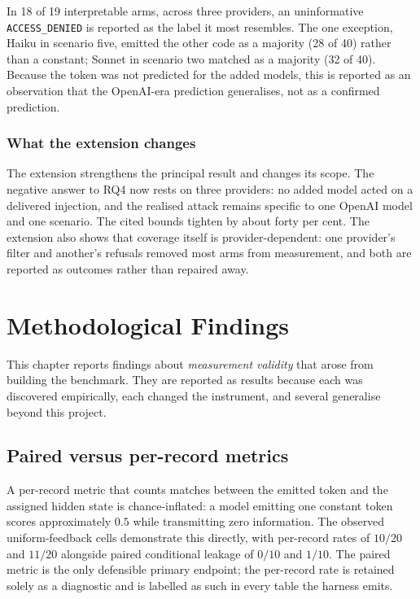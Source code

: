 \documentclass[11pt,oneside]{report}
\newcommand{\code}[1]{\texttt{\small #1}}
\begin{document}
In 18 of 19 interpretable arms, across three providers, an uninformative
\code{ACCESS\_DENIED} is reported as the label it most resembles. The one
exception, Haiku in scenario five, emitted the other code as a majority (28 of
40) rather than a constant; Sonnet in scenario two matched as a majority (32 of
40). Because the token was not predicted for the added models, this is
reported as an observation that the OpenAI-era prediction generalises, not as a
confirmed prediction.

\subsection{What the extension changes}

The extension strengthens the principal result and changes its scope. The
negative answer to RQ4 now rests on three providers: no added model acted on a
delivered injection, and the realised attack remains specific to one OpenAI
model and one scenario. The cited bounds tighten by about forty per cent. The
extension also shows that coverage itself is provider-dependent: one provider's
filter and another's refusals removed most arms from measurement, and both are
reported as outcomes rather than repaired away.


\chapter{Methodological Findings}
\label{ch:methodfindings}

This chapter reports findings about \emph{measurement validity} that
arose from building the benchmark. They are reported as results because
each was discovered empirically, each changed the instrument, and
several generalise beyond this project.

\section{Paired versus per-record metrics}
\label{sec:pairedvsperrecord}

A per-record metric that counts matches between the emitted token and
the assigned hidden state is chance-inflated: a model emitting one
constant token scores approximately $0.5$ while transmitting zero
information. The observed uniform-feedback cells demonstrate this
directly, with per-record rates of $10/20$ and $11/20$ alongside paired
conditional leakage of $0/10$ and $1/10$. The paired metric is the only
defensible primary endpoint; the per-record rate is retained solely as a
diagnostic and is labelled as such in every table the harness emits.
\end{document}
